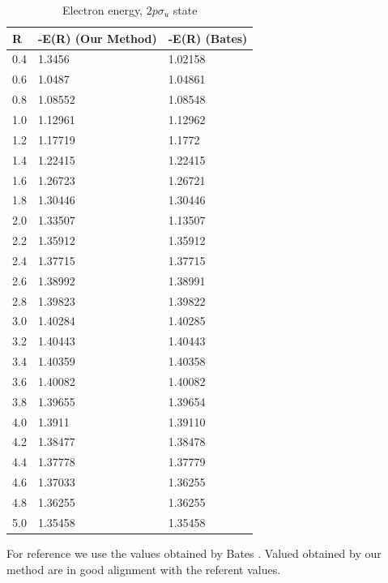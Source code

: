  \begin{table}[ht]
    \caption{Electron energy, $ 2p\sigma_u $ state}
    \centering
  \label{tab:UsVsBates2p}
    \begin{tabular}{ m{4em}  m{4em}  m{4em} }
     \hline
     R & -E(R) (Our Method) & -E(R) (Bates)  \\ \hline \hline
     0.4 & 1.3456 & 1.02158 \\
     0.6 & 1.0487 & 1.04861 \\
     0.8 & 1.08552 & 1.08548 \\
     1.0 & 1.12961 & 1.12962 \\
     1.2 & 1.17719 & 1.1772 \\
     1.4 & 1.22415 & 1.22415 \\
     1.6 & 1.26723 & 1.26721 \\
     1.8 & 1.30446 & 1.30446 \\
     2.0 & 1.33507 & 1.13507 \\
     2.2 & 1.35912 & 1.35912 \\
     2.4 & 1.37715 & 1.37715 \\
     2.6 & 1.38992 & 1.38991 \\
     2.8 & 1.39823 & 1.39822 \\
     3.0 & 1.40284 & 1.40285 \\
     3.2 & 1.40443 & 1.40443 \\
     3.4 & 1.40359 & 1.40358 \\
     3.6 & 1.40082 & 1.40082 \\
     3.8 & 1.39655 & 1.39654 \\
     4.0 & 1.3911 & 1.39110 \\
     4.2 & 1.38477 & 1.38478 \\
     4.4 & 1.37778 & 1.37779 \\
     4.6 & 1.37033 & 1.36255 \\
     4.8 & 1.36255 & 1.36255 \\
      5.0 & 1.35458 & 1.35458 \\
     \hline
    \end{tabular}
  \end{table}


For reference we use the values obtained by Bates \cite{Bates1}\cite{Bates2}. Valued obtained by our method are in good alignment with the referent values.
